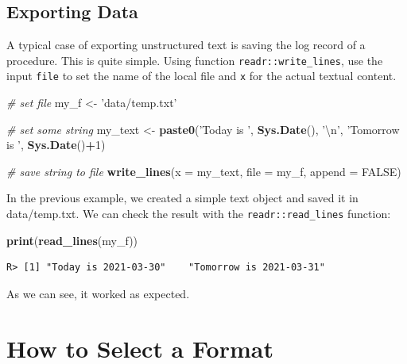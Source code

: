 \documentclass[
  12pt,
]{book}
\newenvironment{Shaded}{\begin{snugshade}}{\end{snugshade}}
\newcommand{\CharTok}[1]{\textcolor[rgb]{0.5,0.5,0.5}{#1}}
\newcommand{\CommentTok}[1]{\textcolor[rgb]{0.37,0.37,0.37}{\textit{#1}}}
\newcommand{\DataTypeTok}[1]{\textcolor[rgb]{0.27,0.27,0.27}{#1}}
\newcommand{\DecValTok}[1]{\textcolor[rgb]{0.06,0.06,0.06}{#1}}
\newcommand{\KeywordTok}[1]{\textcolor[rgb]{0.27,0.27,0.27}{\textbf{#1}}}
\newcommand{\NormalTok}[1]{#1}
\newcommand{\OperatorTok}[1]{\textcolor[rgb]{0.43,0.43,0.43}{\textbf{#1}}}
\newcommand{\OtherTok}[1]{\textcolor[rgb]{0.37,0.37,0.37}{#1}}
\newcommand{\StringTok}[1]{\textcolor[rgb]{0.5,0.5,0.5}{#1}}
\begin{document}
\hypertarget{exporting-data-5}{%
\subsection{Exporting Data}\label{exporting-data-5}}

A typical case of exporting unstructured text is saving the log record of a procedure. This is quite simple. Using function \texttt{readr::write\_lines}, use the input \texttt{file} to set the name of the local file and \texttt{x} for the actual textual content. 

\begin{Shaded}
\begin{Highlighting}[]
\CommentTok{# set file}
\NormalTok{my_f <-}\StringTok{ 'data/temp.txt'}

\CommentTok{# set some string}
\NormalTok{my_text <-}\StringTok{ }\KeywordTok{paste0}\NormalTok{(}\StringTok{'Today is '}\NormalTok{, }\KeywordTok{Sys.Date}\NormalTok{(), }\StringTok{'}\CharTok{\textbackslash{}n}\StringTok{'}\NormalTok{, }
                  \StringTok{'Tomorrow is '}\NormalTok{, }\KeywordTok{Sys.Date}\NormalTok{()}\OperatorTok{+}\DecValTok{1}\NormalTok{)}

\CommentTok{# save string to file}
\KeywordTok{write_lines}\NormalTok{(}\DataTypeTok{x =}\NormalTok{ my_text, }\DataTypeTok{file =}\NormalTok{ my_f, }\DataTypeTok{append =} \OtherTok{FALSE}\NormalTok{)}
\end{Highlighting}
\end{Shaded}

In the previous example, we created a simple text object and saved it in data/temp.txt. We can check the result with the \texttt{readr::read\_lines} function:

\begin{Shaded}
\begin{Highlighting}[]
\KeywordTok{print}\NormalTok{(}\KeywordTok{read_lines}\NormalTok{(my_f))}
\end{Highlighting}
\end{Shaded}

\begin{verbatim}
R> [1] "Today is 2021-03-30"    "Tomorrow is 2021-03-31"
\end{verbatim}

As we can see, it worked as expected.

\hypertarget{how-to-select-a-format}{%
\section{How to Select a Format}\label{how-to-select-a-format}}
\end{document}
